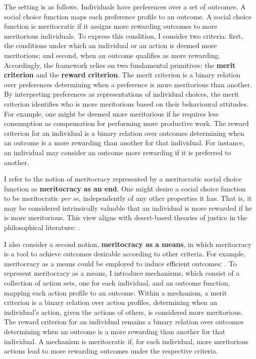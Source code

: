 The setting is as follows. Individuals have preferences over a set of outcomes. A social choice function maps each preference profile to an outcome. A social choice function is meritocratic if it assigns more rewarding outcomes to more meritorious individuals. To express this condition, I consider two criteria: first, the conditions under which an individual or an action is deemed more meritorious; and second, when an outcome qualifies as more rewarding. Accordingly, the framework relies on two fundamental primitives: the \textbf{merit criterion} and the \textbf{reward criterion}. The merit criterion is a binary relation over preferences determining when a preference is more meritorious than another. By interpreting preferences as representations of individual choices, the merit criterion identifies who is more meritorious based on their behavioural attitudes. For example, one might be deemed more meritorious if he requires less consumption as compensation for performing more productive work. The reward criterion for an individual is a binary relation over outcomes determining when an outcome is a more rewarding than another for that individual. For instance, an individual may consider an outcome more rewarding if it is preferred to another.

I refer to the notion of meritocracy represented by a meritocratic social choice function as \textbf{meritocracy as an end}. One might desire a social choice function to be meritocratic \emph{per se}, independently of any other properties it has. That is, it may be considered intrinsically valuable that an individual is more rewarded if he is more meritorious. This view aligns with desert-based theories of justice in the philosophical literature:  \citep[p. 5]{kaganGeometryDesert2014}.

I also consider a second notion, \textbf{meritocracy as a means}, in which meritocracy is a tool to achieve outcomes desirable according to other criteria. For example, meritocracy as a means could be employed to induce efficient outcomes:  \citep[p. 1]{morganLimitsMeritocracy2022}. To represent meritocracy as a means, I introduce mechanisms, which consist of a collection of action sets, one for each individual, and an outcome function, mapping each action profile to an outcome. Within a mechanism, a merit criterion is a binary relation over action profiles, determining when an individual's action, given the actions of others, is considered more meritorious. The reward criterion for an individual remains a binary relation over outcomes determining when an outcome is a more rewarding than another for that individual. A mechanism is meritocratic if, for each individual, more meritorious actions lead to more rewarding outcomes under the respective criteria.

